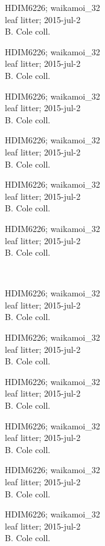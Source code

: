 \documentclass[2pt]{extarticle}
\begin{document}
\noindent
\parbox{0.16\textwidth}{\tiny \raggedright \rule[-0.3\baselineskip]{0pt}{10pt}HDIM6226; waikamoi\_32\\ leaf litter; 2015-jul-2\\ B. Cole coll.}
\parbox{0.16\textwidth}{\tiny \raggedright \rule[-0.3\baselineskip]{0pt}{10pt}HDIM6226; waikamoi\_32\\ leaf litter; 2015-jul-2\\ B. Cole coll.}
\parbox{0.16\textwidth}{\tiny \raggedright \rule[-0.3\baselineskip]{0pt}{10pt}HDIM6226; waikamoi\_32\\ leaf litter; 2015-jul-2\\ B. Cole coll.}
\parbox{0.16\textwidth}{\tiny \raggedright \rule[-0.3\baselineskip]{0pt}{10pt}HDIM6226; waikamoi\_32\\ leaf litter; 2015-jul-2\\ B. Cole coll.}
\parbox{0.16\textwidth}{\tiny \raggedright \rule[-0.3\baselineskip]{0pt}{10pt}HDIM6226; waikamoi\_32\\ leaf litter; 2015-jul-2\\ B. Cole coll.}
\parbox{0.16\textwidth}{\tiny \raggedright \rule[-0.3\baselineskip]{0pt}{10pt}HDIM6226; waikamoi\_32\\ leaf litter; 2015-jul-2\\ B. Cole coll.} \\ 
\vspace{0.001in} 

\noindent
\parbox{0.16\textwidth}{\tiny \raggedright \rule[-0.3\baselineskip]{0pt}{10pt}HDIM6226; waikamoi\_32\\ leaf litter; 2015-jul-2\\ B. Cole coll.}
\parbox{0.16\textwidth}{\tiny \raggedright \rule[-0.3\baselineskip]{0pt}{10pt}HDIM6226; waikamoi\_32\\ leaf litter; 2015-jul-2\\ B. Cole coll.}
\parbox{0.16\textwidth}{\tiny \raggedright \rule[-0.3\baselineskip]{0pt}{10pt}HDIM6226; waikamoi\_32\\ leaf litter; 2015-jul-2\\ B. Cole coll.}
\parbox{0.16\textwidth}{\tiny \raggedright \rule[-0.3\baselineskip]{0pt}{10pt}HDIM6226; waikamoi\_32\\ leaf litter; 2015-jul-2\\ B. Cole coll.}
\parbox{0.16\textwidth}{\tiny \raggedright \rule[-0.3\baselineskip]{0pt}{10pt}HDIM6226; waikamoi\_32\\ leaf litter; 2015-jul-2\\ B. Cole coll.}
\parbox{0.16\textwidth}{\tiny \raggedright \rule[-0.3\baselineskip]{0pt}{10pt}HDIM6226; waikamoi\_32\\ leaf litter; 2015-jul-2\\ B. Cole coll.} \\ 
\vspace{0.001in} 
\end{document}
